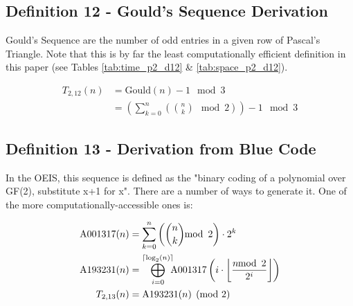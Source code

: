 \documentclass[conference]{IEEEtran}
\begin{document}
\subsection{Definition 12 - Gould's Sequence Derivation}


Gould's Sequence \cite{OEIS-Gould} are the number of odd entries in a given row of Pascal's Triangle. Note that this is by far the least computationally efficient definition in this paper (see Tables \ref{tab:time_p2_d12} \& \ref{tab:space_p2_d12}).


\begin{equation}
    \label{eq:p2d12}
    \begin{aligned}
T_{2,12}(n) &= \text{Gould}(n) - 1 \mod{3} \\
            &= \left(\sum_{k=0}^n \left(\binom{n}{k} \mod{2} \right)\right) - 1 \mod{3}
    \end{aligned}
\end{equation}

\subsection{Definition 13 - Derivation from Blue Code}


In the OEIS, this sequence \cite{OEIS-A193231} is defined as the "binary coding of a polynomial over GF(2), substitute x+1 for x". There are a number of ways to generate it. One of the more computationally-accessible ones is:

\begin{equation}
    \label{eq:p2d13}
    \begin{aligned}
\text{A001317}(n) &= \sum_{k=0}^n \left(\binom{n}{k} \mod{2} \right) \cdot 2^k \\
\text{A193231}(n) &= \bigoplus_{i=0}^{\ceil{\log_2(n)}} \hspace{-5pt} \text{A001317}\left(i \cdot \floor{\dfrac{n \mod{2}}{2^i}}\right) \\
      T_{2,13}(n) &= \text{A193231}(n) \pmod{2}
    \end{aligned}
\end{equation}
\end{document}

